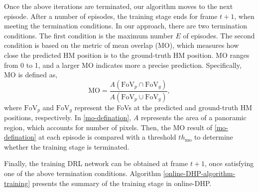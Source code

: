 \documentclass[10pt,journal,compsoc]{IEEEtran}
\begin{document}
%

Once the above iterations are terminated, our algorithm moves to the next episode.
After a number of episodes, the training stage ends for frame $t+1$, when meeting the termination conditions.
In our approach, there are two termination conditions. The first condition is the maximum number $E$ of episodes.
The second condition is based on the metric of mean overlap (MO), which measures how close the predicted HM position is to the ground-truth HM position.
MO ranges from 0 to 1, and a larger MO indicates more a precise prediction.
Specifically, MO is defined as,
\begin{equation}
\label{mo-defination}
\textrm{MO} =\frac{A(\textrm{FoV}_{p} \cap \textrm{FoV}_{g})}{A(\textrm{FoV}_{p} \cup \textrm{FoV}_{g})},
\end{equation}
where $\textrm{FoV}_{p}$ and $\textrm{FoV}_{g}$ represent the FoVs at the predicted and ground-truth HM positions, respectively.
In \eqref{mo-defination}, $A$ represents the area of a panoramic region, which accounts for number of pixels.
Then, the MO result of \eqref{mo-defination} at each episode is compared with a threshold $th_{\text{mo}}$ to determine whether the training stage is terminated.

Finally, the training DRL network can be obtained at frame $t+1$, once satisfying one of  the above termination conditions.
Algorithm \ref{online-DHP-algorithm-training} presents the summary of the training stage in online-DHP.
\end{document}
